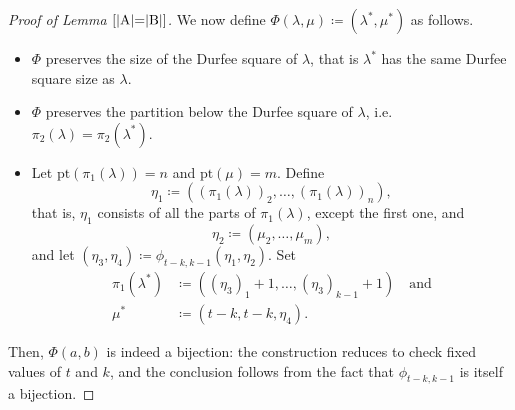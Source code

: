 \documentclass[a4paper, 12pt, oneside]{amsart}
\theoremstyle{definition}
\newcommand{\pt}{\mathrm{pt}}
\begin{document}
\begin{proof}[Proof of Lemma $\ref{|A|=|B|}$]
We now define $\Phi(\lambda,\mu)\coloneqq(\lambda^*, \mu^*)$ as follows.
\begin{itemize}
    \item $\Phi$ preserves the size of the Durfee square of $\lambda$, that is $\lambda^*$ has the same Durfee square size as $\lambda$.
    \item $\Phi$ preserves the partition below the Durfee square of $\lambda$, i.e.  $\pi_2(\lambda)=\pi_2(\lambda^*)$.
    \item  Let $\pt(\pi_1(\lambda))=n$ and $\pt(\mu)=m$. Define
    $$\eta_1 \coloneqq((\pi_1(\lambda))_2,\dots,(\pi_1(\lambda))_n),$$ that is, $\eta_1$ consists of all the parts of $\pi_1(\lambda)$, except the first one, and 
    $$\eta_2\coloneqq(\mu_2,\dots,\mu_m),$$
    and let $(\eta_3,\eta_4)\coloneqq \phi_{t-k,k-1}(\eta_1,\eta_2)$. Set
    \begin{align*}
    \pi_1(\lambda^*)&\coloneqq ((\eta_3)_1+1,\dots,(\eta_3)_{k-1}+1)\quad \text{and}\\
    \mu{^*}&\coloneqq (t-k,t-k,\eta_4). 
     \end{align*}
    \end{itemize}

Then, $\Phi(a,b)$ is indeed a bijection: the construction reduces to check fixed values of $t$ and $k$, and the conclusion follows from the fact that
$\phi_{t-k,k-1}$ is itself a bijection.
\end{proof}
\end{document}
